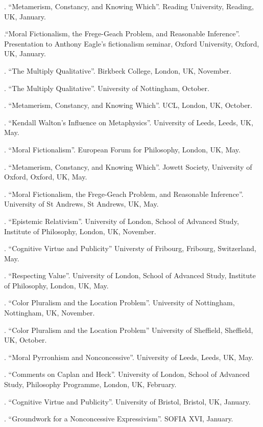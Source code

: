 \documentclass[11pt]{article}
\begin{document}
. ``Metamerism, Constancy, and Knowing Which''. Reading University, Reading, UK, January.

.``Moral Fictionalism, the Frege-Geach Problem, and Reasonable Inference''. Presentation to Anthony Eagle's fictionalism seminar, Oxford University, Oxford, UK, January.

. ``The Multiply Qualitative''. Birkbeck College, London, UK, November.

. ``The Multiply Qualitative''. University of Nottingham, October.

. ``Metamerism, Constancy, and Knowing Which''. UCL, London, UK, October.

. ``Kendall Walton's Influence on Metaphysics''. University of Leeds, Leeds, UK, May.

. ``Moral Fictionalism''. European Forum for Philosophy, London, UK, May.

. ``Metamerism, Constancy, and Knowing Which''. Jowett Society, University of Oxford, Oxford, UK, May.

. ``Moral Fictionalism, the Frege-Geach Problem, and Reasonable Inference''. University of St Andrews, St Andrews, UK, May.

. ``Epistemic Relativism''. University of London, School of Advanced Study, Institute of Philosophy, London, UK, November.

. ``Cognitive Virtue and Publicity'' Universty of Fribourg, Fribourg, Switzerland, May. 

. ``Respecting Value''. University of London, School of Advanced Study, Institute of Philosophy, London, UK, May.

. ``Color Pluralism and the Location Problem''. University of Nottingham, Nottingham, UK, November.

. ``Color Pluralism and the Location Problem'' University of Sheffield, Sheffield, UK, October.

. ``Moral Pyrronhism and Nonconcessive''. University of Leeds, Leeds, UK, May.

. ``Comments on Caplan and Heck''. University of London, School of Advanced Study, Philosophy Programme, London, UK, February.

. ``Cognitive Virtue and Publicity''. University of Bristol, Bristol, UK, January.

.  ``Groundwork for a Nonconcessive Expressivism''. SOFIA XVI, January.
\end{document}
